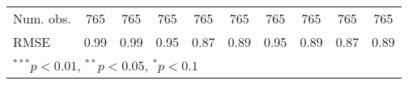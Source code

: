 \begin{table}
\begin{center}
\begin{tabular}{l c c c c c c c c c }
Num. obs.            & 765          & 765          & 765          & 765           & 765           & 765          & 765           & 765           & 765           \\
RMSE                 & 0.99         & 0.99         & 0.95         & 0.87          & 0.89          & 0.95         & 0.89          & 0.87          & 0.89          \\
\hline
\multicolumn{10}{l}{\scriptsize{$^{***}p<0.01$, $^{**}p<0.05$, $^*p<0.1$}}
\end{tabular}
\label{table:coefficients}
\end{center}
\end{table}
